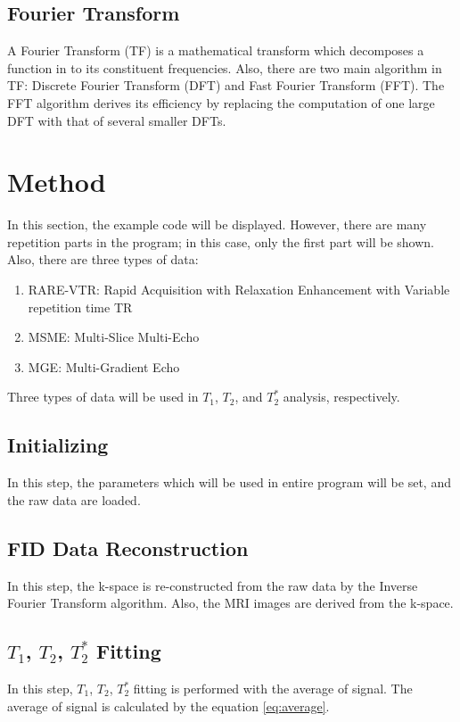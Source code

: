 \documentclass[10pt, a4paper]{article}
\begin{document}
		\subsection{Fourier Transform}
			A Fourier Transform (TF) is a mathematical transform which decomposes a function in to its constituent frequencies. Also, there are two main algorithm in TF: Discrete Fourier Transform (DFT) and Fast Fourier Transform (FFT). The FFT algorithm derives its efficiency by replacing the computation of one large DFT with that of several smaller DFTs. \cite{ref:FFT1}
	
	\section{Method}
		In this section, the example code will be displayed. However, there are many repetition parts in the program; in this case, only the first part will be shown. Also, there are three types of data:
		\begin{enumerate}
			\item RARE-VTR: Rapid Acquisition with Relaxation Enhancement with Variable repetition time TR
			\item MSME: Multi-Slice Multi-Echo
			\item MGE: Multi-Gradient Echo
		\end{enumerate}
		Three types of data will be used in $T_1$, $T_2$, and $T_2^*$ analysis, respectively.
	
		\subsection{Initializing}
			In this step, the parameters which will be used in entire program will be set, and the raw data are loaded. 
			
			
	
		\subsection{FID Data Reconstruction}
			In this step, the k-space is re-constructed from the raw data by the Inverse Fourier Transform algorithm. Also, the MRI images are derived from the k-space. 
		
			
		
		\subsection{$T_1$, $T_2$, $T_2^*$ Fitting}
			In this step, $T_1$, $T_2$, $T_2^*$ fitting is performed with the average of signal. The average of signal is calculated by the equation \ref{eq:average}.
			
\end{document}
